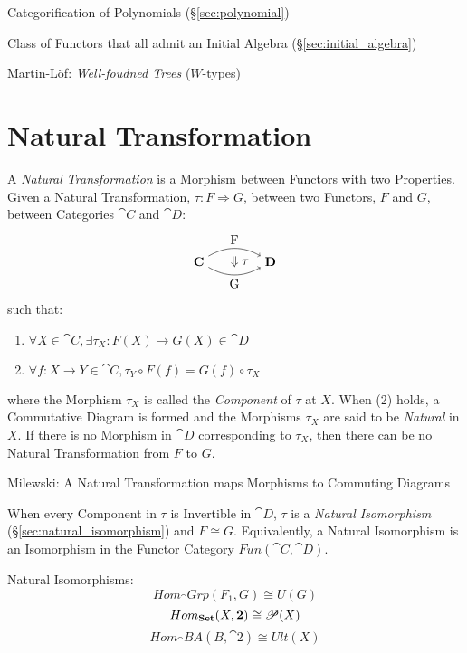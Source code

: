 Categorification of Polynomials (\S\ref{sec:polynomial})

Class of Functors that all admit an Initial Algebra
(\S\ref{sec:initial_algebra})

Martin-L\"of: \emph{Well-foudned Trees} ($W$-types) %



\section{Natural Transformation}\label{sec:natural_transformation}

A \emph{Natural Transformation} is a Morphism between Functors with
two Properties. Given a Natural Transformation, $\tau : F \Rightarrow
G$, between two Functors, $F$ and $G$, between Categories $\cat{C}$
and $\cat{D}$:
\[
  \begin{tikzpicture}
    \node (C) at (-1,0) {$\cat{C}$};
    \node (D) at (1,0) {$\cat{D}$};
    \node (T) at (0,0) {$\;\;\;\Downarrow\tau$};
    \draw[->,bend left] (C) to node [above] {F} (D);
    \draw[->,bend right] (C) to node [below] {G} (D);
  \end{tikzpicture}
\]
such that:
\begin{enumerate}
  \item $\forall X \in \cat{C},
    \exists \tau_X : F(X) \rightarrow G(X) \in \cat{D}$
  \item $\forall f : X \rightarrow Y \in \cat{C},
    \tau_Y \circ F(f) = G(f) \circ \tau_X$
\end{enumerate}
where the Morphism $\tau_X$ is called the \emph{Component} of $\tau$
at $X$. When (2) holds, a Commutative Diagram is formed and the
Morphisms $\tau_X$ are said to be \emph{Natural} in $X$. If there is
no Morphism in $\cat{D}$ corresponding to $\tau_X$, then there can
be no Natural Transformation from $F$ to $G$.

Milewski: A Natural Transformation maps Morphisms to Commuting
Diagrams

When every Component in $\tau$ is Invertible in $\cat{D}$, $\tau$ is a
\emph{Natural Isomorphism} (\S\ref{sec:natural_isomorphism}) and $F
\cong G$. Equivalently, a Natural Isomorphism is an Isomorphism in the
Functor Category $Fun(\cat{C},\cat{D})$.

Natural Isomorphisms:
\[
  Hom_\cat{Grp}(F_1,G) \cong U(G)
\]\[
  Hom_\mathbf{Set}(X,\mathbf{2}) \cong \mathscr{P}(X)
\]\[
  Hom_\cat{BA}(B,\cat{2}) \cong Ult(X)
\]

